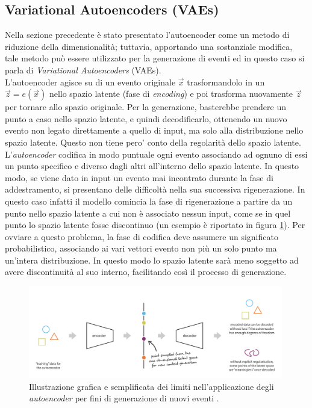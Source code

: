 
\subsection{Variational Autoencoders (VAEs)}
\label{VAEs}

Nella sezione precedente è stato presentato l'autoencoder come un metodo di riduzione della dimensionalità; tuttavia, apportando una sostanziale modifica, tale metodo può essere utilizzato per la generazione di eventi ed in questo caso si parla di \textit{Variational Autoencoders} (VAEs). \\ 
L'autoencoder agisce su di un evento originale $\vec{x}$ trasformandolo in un $\vec{z} = e(\vec{x})$ nello spazio latente (fase di \textit{encoding}) e poi trasforma nuovamente $\vec{z}$ per tornare allo spazio originale. Per la generazione, basterebbe prendere un punto a caso nello spazio latente, e quindi decodificarlo, ottenendo un nuovo evento non legato direttamente a quello di input, ma solo alla distribuzione nello spazio latente. Questo non tiene pero' conto della regolarità dello spazio latente.\\ 
L'\textit{autoencoder} codifica in modo puntuale ogni evento associando ad ognuno di essi un punto specifico e diverso dagli altri all'interno dello spazio latente. In questo modo, se viene dato in input un evento mai incontrato durante la fase di addestramento, si presentano delle difficoltà nella sua successiva rigenerazione. In questo caso infatti il modello comincia la fase di rigenerazione a partire da un punto nello spazio latente a cui non è associato nessun input, come se in quel punto lo spazio latente fosse discontinuo (un esempio è riportato in figura \ref{limite autoencoder}). Per ovviare a questo problema, la fase di codifica deve assumere un significato probabilistico, associando ai vari vettori evento non più un solo punto ma un'intera distribuzione. In questo modo lo spazio latente sarà meno soggetto ad avere discontinuità al suo interno, facilitando così il processo di generazione.

\begin{figure}[h!]
	\centering
	\includegraphics[width=0.99\textwidth]{figs/limite_autoencoder.png}
	\caption{Illustrazione grafica e semplificata dei limiti nell'applicazione degli \textit{autoencoder} per fini di generazione di nuovi eventi \cite{Understanding_VAEs}.}
	\label{limite autoencoder}
\end{figure}
 

